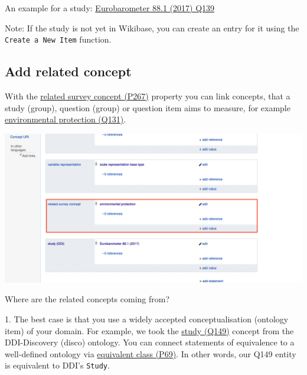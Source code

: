 \documentclass[
  letterpaper,
  DIV=11,
  numbers=noendperiod]{scrreprt}
\begin{document}
An example for a study:
\href{https://reprexbase.eu/demowiki/index.php?title=Item:Q139}{Eurobarometer
88.1 (2017) Q139}

\begin{tcolorbox}[enhanced jigsaw, opacityback=0, bottomrule=.15mm, rightrule=.15mm, toptitle=1mm, breakable, colbacktitle=quarto-callout-note-color!10!white, colback=white, title=\textcolor{quarto-callout-note-color}{\faInfo}\hspace{0.5em}{Note}, leftrule=.75mm, toprule=.15mm, left=2mm, arc=.35mm, colframe=quarto-callout-note-color-frame, coltitle=black, titlerule=0mm, bottomtitle=1mm, opacitybacktitle=0.6]

Note: If the study is not yet in Wikibase, you can create an entry for
it using the \texttt{Create\ a\ New\ Item} function.

\end{tcolorbox}

\subsection{Add related concept}\label{add-related-concept}

With the
\href{https://reprexbase.eu/demowiki/index.php?title=Property:P267}{related
survey concept (P267)} property you can link concepts, that a study
(group), question (group) or question item aims to measure, for example
\href{https://reprexbase.eu/demowiki/index.php?title=Item:Q131}{environmental
protection (Q131)}.

\begin{center}
\includegraphics{png/question_to_wikibase/statement_relatedSurveyConcept_2x1.png}
\end{center}

Where are the related concepts coming from?

1. The best case is that you use a widely accepted conceptualisation
(ontology item) of your domain. For example, we took the
\href{https://reprexbase.eu/demowiki/index.php?title=Item:Q138}{study
(Q149)} concept from the DDI-Discovery (disco) ontology. You can connect
statements of equivalence to a well-defined ontology via
\href{https://reprexbase.eu/demowiki/index.php?title=Property:P69}{equivalent
class (P69)}. In other words, our Q149 entity is equivalent to DDI's
\texttt{Study}.
\end{document}

